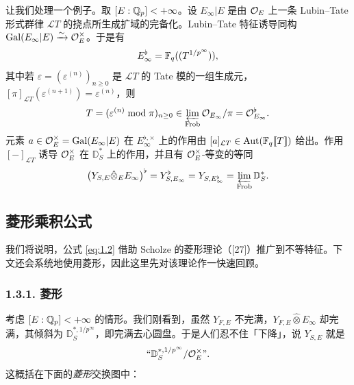 \leavevmode{}让我们处理一个例子。取 $[E:\mathbb{Q}_p]<+\infty$。设 $E_\infty|E$ 是由 $\mathcal{O}_E$ 上一条 Lubin–Tate 形式群律 $\mathcal{L}T$ 的挠点所生成扩域的完备化。Lubin–Tate 特征诱导同构 $\operatorname{Gal}(E_\infty|E)\xrightarrow{\sim}\mathcal{O}_E^\times$。于是有
\[
  E_\infty^\flat=\mathbb{F}_q((T^{1/p^\infty})),
\]
其中若 $\varepsilon=(\varepsilon^{(n)})_{n\ge0}$ 是 $\mathcal{L}T$ 的 Tate 模的一组生成元，$[\pi]_{\mathcal{L}T}(\varepsilon^{(n+1)})=\varepsilon^{(n)}$，则
\[
  T=(\varepsilon^{(n)}\bmod\pi)_{n\ge0}\in\varprojlim_{\mathrm{Frob}}\mathcal{O}_{E_\infty}/\pi=\mathcal{O}^\flat_{E_\infty}.
\]
元素 $a\in\mathcal{O}_E^\times=\operatorname{Gal}(E_\infty|E)$ 在 $E_\infty^{\flat,\times}$ 上的作用由 $[a]_{\mathcal{L}T}\in\operatorname{Aut}(\mathbb{F}_q\llbracket T\rrbracket)$ 给出。作用 $[-]_{\mathcal{L}T}$ 诱导 $\mathcal{O}_E^\times$ 在 $\mathbb{D}^*_S$ 上的作用，并且有 $\mathcal{O}_E^\times$-等变的等同
\[
  \bigl(Y_{S,E}\hat\otimes_EE_\infty\bigr)^\flat=Y^\flat_{S,E_\infty}=Y_{S,E_\infty^\flat}=\varprojlim_{\mathrm{Frob}}\mathbb{D}^*_S.
\]

\subsection{菱形乘积公式}%

我们将说明，公式 \eqref{eq:1.2} 借助 Scholze 的菱形理论（[27]）推广到不等特征。下文还会系统地使用菱形，因此这里先对该理论作一快速回顾。

\subsubsection*{1.3.1. 菱形}%

考虑 $[E:\mathbb{Q}_p]<+\infty$ 的情形。我们刚看到，虽然 $Y_{F,E}$ 不完满，$Y_{F,E}\hat\otimes E_\infty$ 却完满，其倾斜为 $\mathbb{D}^{*,1/p^\infty}_S$，即完满去心圆盘。于是人们忍不住「下降」，说 $Y_{S,E}$ 就是
\begin{equation}\label{eq:1.4}
  \text{“}\mathbb{D}^{*,1/p^\infty}_S/\mathcal{O}_E^\times\text{”}.
\end{equation}
这概括在下面的\emph{菱形}交换图中：
\begin{center}
\end{center}


